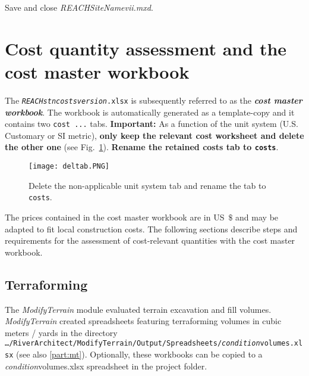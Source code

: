 Save and close \emph{REACH{\myUnderscore}SiteName{\myUnderscore}vii.mxd}.

\section{Cost quantity assessment and the cost master workbook}\label{sec:pmcq}
The \texttt{\emph{REACH}{\myUnderscore}\emph{stn}{\myUnderscore}\emph{costs}{\myUnderscore}\emph{version}.xlsx} is subsequently referred to as the \textbf{\textit{cost master workbook}}. The workbook is automatically generated as a template-copy and it contains two \texttt{cost ...} tabs. \textbf{Important:} As a function of the unit system (U.S. Customary or SI metric), \textbf{only keep the relevant cost worksheet and delete the other one} (see Fig.~\ref{fig:deltab}). \textbf{Rename the retained costs tab to \texttt{costs}}.
\begin{figure}[!h]
	\begin{center}
	\texttt{[image: deltab.PNG]}
	\caption{Delete the non-applicable unit system tab and rename the tab to \texttt{costs}. \label{fig:deltab}}
	\end{center}
\end{figure}

The prices contained in the cost master workbook are in US~$\$$ and may be adapted to fit local construction costs. The following sections describe steps and requirements for the assessment of cost-relevant quantities with the cost master workbook.

\subsection{Terraforming} \label{sec:pmterraf}

The \emph{ModifyTerrain} module evaluated terrain excavation and fill volumes. \emph{ModifyTerrain} created spreadsheets featuring terraforming volumes in cubic meters / yards in the directory \texttt{\ldots{}/RiverArchitect/ModifyTerrain/Output/Spreadsheets/\emph{condition}{\myUnderscore}volumes.xlsx} (see also \ref{part:mt}). Optionally, these workbooks can be copied to a \emph{condition}{\myUnderscore}volumes.xlsx spreadsheet in the project folder.\\


